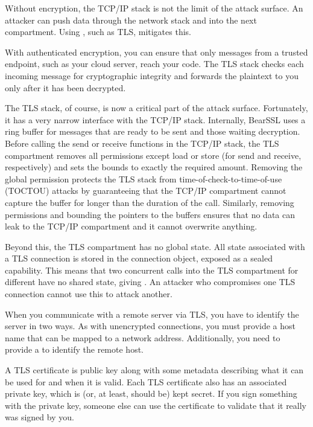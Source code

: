 Without encryption, the TCP/IP stack is not the limit of the attack surface.
An attacker can push data through the network stack and into the next compartment.
Using , such as TLS, mitigates this.

With authenticated encryption, you can ensure that only messages from a trusted endpoint, such as your cloud server, reach your code.
The TLS stack checks each incoming message for cryptographic integrity and forwards the plaintext to you only after it has been decrypted.

The TLS stack, of course, is now a critical part of the attack surface.
Fortunately, it has a very narrow interface with the TCP/IP stack.
Internally, BearSSL uses a ring buffer for messages that are ready to be sent and those waiting decryption.
Before calling the send or receive functions in the TCP/IP stack, the TLS compartment removes all permissions except load or store (for send and receive, respectively) and sets the bounds to exactly the required amount.
Removing the global permission protects the TLS stack from time-of-check-to-time-of-use (TOCTOU) attacks by guaranteeing that the TCP/IP compartment cannot capture the buffer for longer than the duration of the call.
Similarly, removing permissions and bounding the pointers to the buffers ensures that no data can leak to the TCP/IP compartment and it cannot overwrite anything.

Beyond this, the TLS compartment has no global state.
All state associated with a TLS connection is stored in the connection object, exposed as a sealed capability.
This means that two concurrent calls into the TLS compartment for different have no shared state, giving .
An attacker who compromises one TLS connection cannot use this to attack another.

When you communicate with a remote server via TLS, you have to identify the server in two ways.
As with unencrypted connections, you must provide a host name that can be mapped to a network address.
Additionally, you need to provide a  to identify the remote host.

A TLS certificate is public key along with some metadata describing what it can be used for and when it is valid.
Each TLS certificate also has an associated private key, which is (or, at least, should be) kept secret.
If you sign something with the private key, someone else can use the certificate to validate that it really was signed by you.

